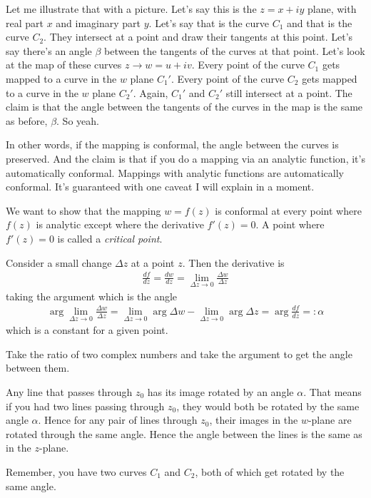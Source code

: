 Let me illustrate that with a picture.
Let's say this is the $z=x+iy$ plane,
with real part $x$ and imaginary part $y$.
Let's say that is the curve $C_1$
and that is the curve $C_2$.
They intersect at a point and
draw their tangents at this point.
Let's say there's an angle $\beta$ between the tangents of the curves at that
point.
Let's look at the map of these curves $z\to w = u + iv$.
Every point of the curve $C_1$ gets mapped to a curve in the $w$ plane $C_1'$.
Every point of the curve $C_2$ gets mapped to a curve in the $w$ plane $C_2'$.
Again, $C_1'$ and $C_2'$ still intersect at a point.
The claim is that the angle between the tangents of the curves in the map is the
same as before, $\beta$.
So yeah.

In other words,
if the mapping is conformal,
the angle between the curves is preserved.
And the claim is that if you do a mapping via an analytic function,
it's automatically conformal.
Mappings with analytic functions are automatically conformal.
It's guaranteed with one caveat I will explain in a moment.

We want to show that the mapping $w=f(z)$
is conformal at every point where $f(z)$ is analytic
except where the derivative $f'(z)=0$.
A point where $f'(z)=0$ is called a \emph{critical point}.

Consider a small change $\Delta z$ at a point $z$.
Then the derivative is
\begin{align}
    \frac{df}{dz} = \frac{dw}{dz}
    = \lim_{\Delta z\to 0} \frac{\Delta w}{\Delta z}
\end{align}
taking the argument which is the angle
\begin{align}
    \arg \lim_{\Delta z\to 0} \frac{\Delta w}{\Delta z}
    = \lim_{\Delta z\to 0} \arg \Delta w
    - \lim_{\Delta z\to 0} \arg \Delta z
    = \arg \frac{df}{dz} =: \alpha
\end{align}
which is a constant for a given point.

Take the ratio of two complex numbers and take the argument to get the angle
between them.

Any line that passes through $z_0$
has its image rotated by an angle $\alpha$.
That means if you had two lines passing through $z_0$,
they would both be rotated by the same angle $\alpha$.
Hence for any pair of lines through $z_0$,
their images in the $w$-plane are rotated through the same angle.
Hence the angle between the lines is the same as in the $z$-plane.

Remember,
you have two curves $C_1$ and $C_2$,
both of which get rotated by the same angle.

